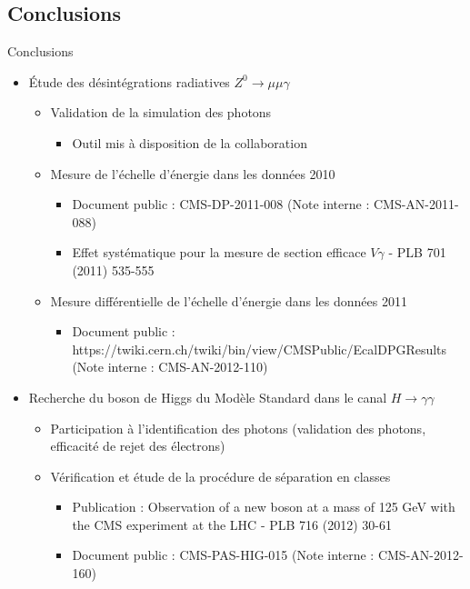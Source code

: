 \documentclass[usenames,dvipsnames]{beamer}
\begin{document}
\subsection{Conclusions}
\begin{frame}{Conclusions}
\vspace{-.5cm}
\begin{block}{}
\begin{itemize}\scriptsize
  \item Étude des désintégrations radiatives $Z^0\to\mu\mu\gamma$
  \begin{itemize}\scriptsize
    \item Validation de la simulation des photons
    \begin{itemize}\tiny
      \item Outil mis à disposition de la collaboration
    \end{itemize}
    \item Mesure de l'échelle d'énergie dans les données 2010
    \begin{itemize}\tiny
      \item Document public : CMS-DP-2011-008 (Note interne : CMS-AN-2011-088)
      \item Effet systématique pour la mesure de section efficace $V\gamma$ - PLB 701 (2011) 535-555
    \end{itemize}
    \item Mesure différentielle de l'échelle d'énergie dans les données 2011
    \begin{itemize}\tiny
      \item Document public : https://twiki.cern.ch/twiki/bin/view/CMSPublic/EcalDPGResults (Note interne : CMS-AN-2012-110)
    \end{itemize}
  \end{itemize}
  \item Recherche du boson de Higgs du Modèle Standard dans le canal $H\to\gamma\gamma$
  \begin{itemize}\scriptsize
    \item Participation à l'identification des photons (validation des photons, efficacité de rejet des électrons)
    \item Vérification et étude de la procédure de séparation en classes
    \begin{itemize}\tiny
      \item Publication : Observation of a new boson at a mass of 125 GeV with the CMS experiment at the LHC - PLB 716 (2012) 30-61
      \item Document public : CMS-PAS-HIG-015 (Note interne : CMS-AN-2012-160)

\end{itemize}
\end{itemize}
\end{itemize}
\end{block}
\end{frame}
\end{document}
